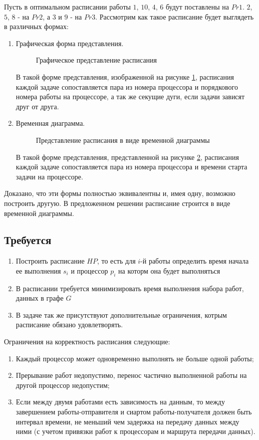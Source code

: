 Пусть в оптимальном расписании работы $1$, $10$, $4$, $6$ будут поставлены на $Pr1$. $2$, $5$, $8$ - на $Pr2$, а $3$ и $9$ - на $Pr3$. Рассмотрим как такое расписание будет выглядеть в различных формах:
\begin{enumerate}
    \item Графическая форма представления.

    \begin{figure}[!htbp]
        \caption{Графическое представление расписания}
        \label{fig:graphical-form}
    \end{figure}
    В такой форме представления, изображенной на рисунке \ref{fig:graphical-form}, расписания каждой задаче сопоставляется пара из номера процессора и порядкового номера работы на процессоре, а так же секущие дуги, если задачи зависят друг от друга. 
    \item Временная диаграмма.

    \begin{figure}[!htbp]
        \caption{Представление расписания в виде временной диаграммы}
        \label{fig:time-diagram}
    \end{figure}
    В такой форме представления, представленной на рисунке \ref{fig:time-diagram}, расписания каждой задаче сопоставляется пара из номера процессора и времени старта задачи на процессоре.
\end{enumerate}
Доказано, что эти формы полностью эквивалентны и, имея одну, возможно построить другую. В предложенном решении расписание строится в виде временной диаграммы.

\subsection{Требуется}
\begin{enumerate}
    \item Построить расписание $HP$, то есть для $i$-й работы определить время начала ее выполнения $s_i$ и процессор $p_i$ на которм она будет выполняться
    \item В расписании требуется минимизировать время выполнения набора работ, данных в графе $G$
    \item В задаче так же присутствуют дополнительные ограничения, котрым расписание обязано удовлетворять.
\end{enumerate}
Ограничения на корректность расписания следующие:
\begin{enumerate}
    \item Каждый процессор может одновременно выполнять не больше одной работы;
    \item Прерывание работ недопустимо, перенос частично выполненной работы на другой процессор недопустим;
    \item Если между двумя работами есть зависимость на данным, то между завершением работы-отправителя и сиартом работы-получателя должен быть интервал времени, не меньший чем задержка на передачу данных между ними (с учетом привязки работ к процессорам и маршрута передачи данных).
\end{enumerate}
